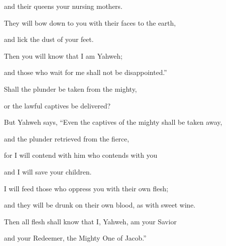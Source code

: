 {\par }{\QB and their queens your nursing mothers.
\par }{\Q They will bow down to you with their faces to the earth,
\par }{\QB and lick the dust of your feet.
\par }{\Q Then you will know that I am Yahweh;
\par }{\QB and those who wait for me shall not be disappointed.”
\par }{\BB \par }{\Q {}Shall the plunder be taken from the mighty,
\par }{\QB or the lawful captives be delivered?
\par }{\Q {}But Yahweh says, “Even the captives of the mighty shall be taken away,
\par }{\QB and the plunder retrieved from the fierce,
\par }{\Q for I will contend with him who contends with you
\par }{\QB and I will save your children.
\par }{\Q {}I will feed those who oppress you with their own flesh;
\par }{\QB and they will be drunk on their own blood, as with sweet wine.
\par }{\Q Then all flesh shall know that I, Yahweh, am your Savior
\par }{\QB and your Redeemer, the Mighty One of Jacob.”

}
